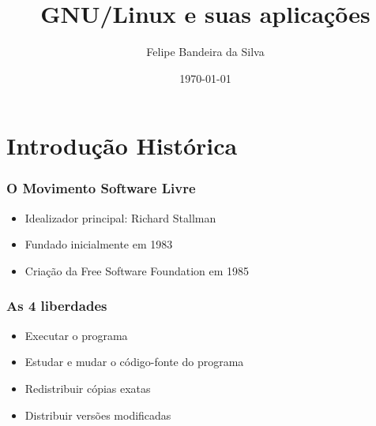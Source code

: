 \documentclass{beamer}
\title[GNU/Linux]{GNU/Linux e suas aplicações} %
\author{Felipe Bandeira da Silva} %
\institute[Unifor] %
{
Universidade de Fortaleza-UNIFOR\\Universidade de Federal do Ceará-UFC\\ %
\medskip
\textit{felipeband18@gmail.com} %
}
\date{\today} %
\begin{document}
\begin{frame}
\titlepage %
\end{frame}



\section{Introdução Histórica} %

\begin{frame}
\frametitle{O Movimento Software Livre}
\begin{itemize}
    \item Idealizador principal: Richard Stallman
    \item Fundado inicialmente em 1983
    \item Criação da Free Software Foundation em 1985
\end{itemize}
\end{frame}

\begin{frame}
\frametitle{As 4 liberdades}
    \begin{itemize}
        \item Executar o programa
        \item Estudar e mudar o código-fonte do programa
        \item Redistribuir cópias exatas
        \item Distribuir versões modificadas
    \end{itemize}
\end{frame}
\end{document}
